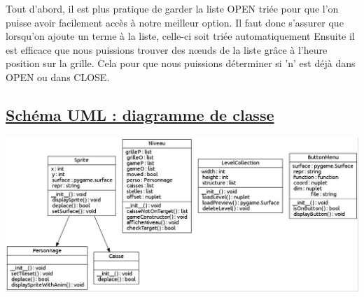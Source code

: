 \documentclass{article}
\begin{document}
Tout d'abord, il est plus pratique de garder la liste OPEN triée pour que l'on puisse avoir facilement accès à notre meilleur option. Il faut donc s'assurer que lorsqu'on ajoute un terme à la liste, celle-ci soit triée automatiquement  \newline
Ensuite il est efficace que nous puissions trouver des nœuds de la liste grâce à l'heure position sur la grille. Cela pour que nous puissions déterminer si 'n' est déjà dans OPEN ou dans CLOSE.


	\newpage	
		
		
		
\begin{center}
	\section{\underline{Schéma UML : diagramme de classe}}
\end{center}
\begin{center}
\vspace{ 4 cm}
\includegraphics[scale=0.4]{img/dia.jpg}
\end{center}
\newpage
\end{document}
